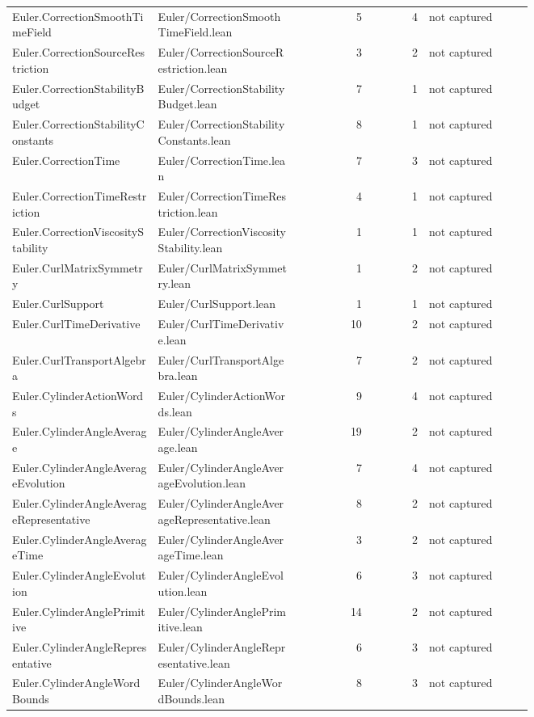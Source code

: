 \documentclass[10pt]{article}
\begin{document}
\begin{longtable}{p{0.28\linewidth}p{0.27\linewidth}r r p{0.20\linewidth}}
Euler.CorrectionSmoothTimeField & Euler/CorrectionSmoothTimeField.lean & 5 & 4 & not captured\\
Euler.CorrectionSourceRestriction & Euler/CorrectionSourceRestriction.lean & 3 & 2 & not captured\\
Euler.CorrectionStabilityBudget & Euler/CorrectionStabilityBudget.lean & 7 & 1 & not captured\\
Euler.CorrectionStabilityConstants & Euler/CorrectionStabilityConstants.lean & 8 & 1 & not captured\\
Euler.CorrectionTime & Euler/CorrectionTime.lean & 7 & 3 & not captured\\
Euler.CorrectionTimeRestriction & Euler/CorrectionTimeRestriction.lean & 4 & 1 & not captured\\
Euler.CorrectionViscosityStability & Euler/CorrectionViscosityStability.lean & 1 & 1 & not captured\\
Euler.CurlMatrixSymmetry & Euler/CurlMatrixSymmetry.lean & 1 & 2 & not captured\\
Euler.CurlSupport & Euler/CurlSupport.lean & 1 & 1 & not captured\\
Euler.CurlTimeDerivative & Euler/CurlTimeDerivative.lean & 10 & 2 & not captured\\
Euler.CurlTransportAlgebra & Euler/CurlTransportAlgebra.lean & 7 & 2 & not captured\\
Euler.CylinderActionWords & Euler/CylinderActionWords.lean & 9 & 4 & not captured\\
Euler.CylinderAngleAverage & Euler/CylinderAngleAverage.lean & 19 & 2 & not captured\\
Euler.CylinderAngleAverageEvolution & Euler/CylinderAngleAverageEvolution.lean & 7 & 4 & not captured\\
Euler.CylinderAngleAverageRepresentative & Euler/CylinderAngleAverageRepresentative.lean & 8 & 2 & not captured\\
Euler.CylinderAngleAverageTime & Euler/CylinderAngleAverageTime.lean & 3 & 2 & not captured\\
Euler.CylinderAngleEvolution & Euler/CylinderAngleEvolution.lean & 6 & 3 & not captured\\
Euler.CylinderAnglePrimitive & Euler/CylinderAnglePrimitive.lean & 14 & 2 & not captured\\
Euler.CylinderAngleRepresentative & Euler/CylinderAngleRepresentative.lean & 6 & 3 & not captured\\
Euler.CylinderAngleWordBounds & Euler/CylinderAngleWordBounds.lean & 8 & 3 & not captured\\

\end{longtable}
\end{document}
